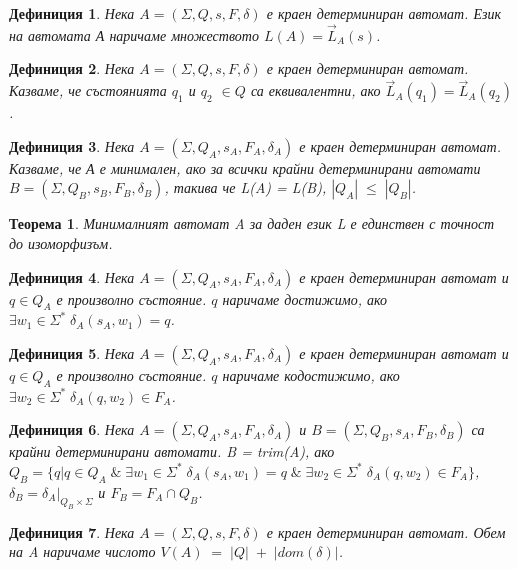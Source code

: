 \documentclass[a4paper,12pt]{article}
\newtheorem{thm}{Теорема}[section]
\newtheorem{defn}{Дефиниция}[section]
\begin{document}
\begin{defn}
Нека $A = (\Sigma, Q, s, F, \delta)$ е краен детерминиран автомат. Език на автомата А наричаме множеството
$L(A) = \vec{L}_A(s)$.
\end{defn}

\begin{defn}
Нека $A = (\Sigma, Q, s, F, \delta)$ е краен детерминиран автомат. Казваме, че състоянията $q_1$ и $q_2$ $\in Q$ са еквивалентни,
ако $\vec{L}_A(q_1) = \vec{L}_A(q_2)$.
\end{defn}

\begin{defn}
Нека $A = (\Sigma, Q_A, s_A, F_A, \delta_A)$ е краен детерминиран автомат. Казваме, че А е минимален, ако за всички
крайни детерминирани автомати $B = (\Sigma, Q_B, s_B, F_B, \delta_B)$, такива че L(A) = L(B), $|Q_A|\;\leq\;|Q_B|$.
\end{defn}

\begin{thm}
Минималният автомат A за даден език L е единствен с точност до изоморфизъм.
\end{thm}

\begin{defn}
Нека $A = (\Sigma, Q_A, s_A, F_A, \delta_A)$ е краен детерминиран автомат и $q \in Q_A$ е произволно състояние. $q$ наричаме достижимо, ако
$\exists w_1 \in \Sigma^* \; \delta_A(s_A, w_1) = q$.
\end{defn}

\begin{defn}
Нека $A = (\Sigma, Q_A, s_A, F_A, \delta_A)$ е краен детерминиран автомат и $q \in Q_A$ е произволно състояние. $q$ наричаме кодостижимо, ако
$\exists w_2 \in \Sigma^* \; \delta_A(q, w_2) \in F_A$.
\end{defn}

\begin{defn}
Нека $A = (\Sigma, Q_A, s_A, F_A, \delta_A)$ и $B = (\Sigma, Q_B, s_A, F_B, \delta_B)$ са крайни детерминирани
автомати. B = trim(A), ако $Q_B = \{q | q \in Q_A \;\&\; \exists w_1 \in \Sigma^* \; \delta_A(s_A, w_1) = q \;\&\; \exists w_2 \in \Sigma^* \; \delta_A(q, w_2) \in F_A\} $,
$\delta_B = \left.{\delta_A}\right|_{Q_B \times \Sigma}$ и $F_B = F_A \cap Q_B$.
\end{defn}

\begin{defn}
Нека $ A = ( \Sigma, Q, s, F, \delta )$ е краен детерминиран автомат. Обем на A наричаме числото $V(A)\;=\;|Q|\;+\;|dom(\delta)|$.
\end{defn}
\pagebreak
\end{document}
